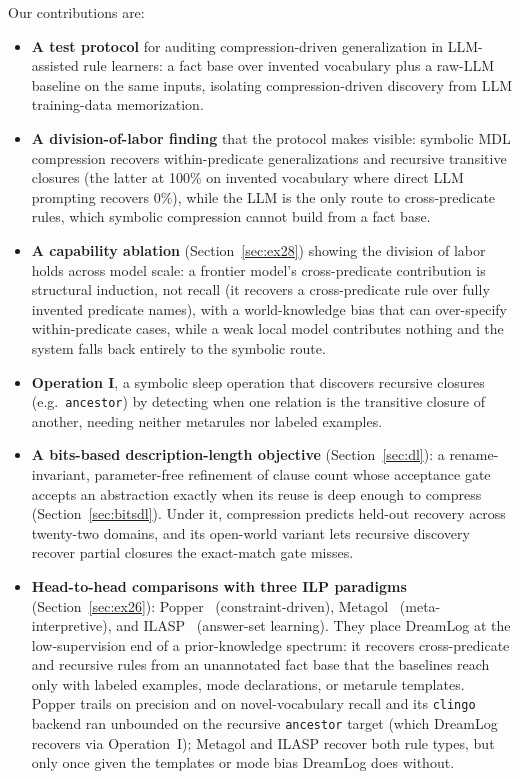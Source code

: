 \documentclass[10pt,conference]{IEEEtran}
\begin{document}
Our contributions are:
\begin{itemize}
\item \textbf{A test protocol} for auditing compression-driven generalization in LLM-assisted rule learners: a fact base over invented vocabulary plus a raw-LLM baseline on the same inputs, isolating compression-driven discovery from LLM training-data memorization.
\item \textbf{A division-of-labor finding} that the protocol makes visible: symbolic MDL compression recovers within-predicate generalizations and recursive transitive closures (the latter at 100\% on invented vocabulary where direct LLM prompting recovers 0\%), while the LLM is the only route to cross-predicate rules, which symbolic compression cannot build from a fact base.
\item \textbf{A capability ablation} (Section~\ref{sec:ex28}) showing the division of labor holds across model scale: a frontier model's cross-predicate contribution is structural induction, not recall (it recovers a cross-predicate rule over fully invented predicate names), with a world-knowledge bias that can over-specify within-predicate cases, while a weak local model contributes nothing and the system falls back entirely to the symbolic route.
\item \textbf{Operation I}, a symbolic sleep operation that discovers recursive closures (e.g.\ \texttt{ancestor}) by detecting when one relation is the transitive closure of another, needing neither metarules nor labeled examples.
\item \textbf{A bits-based description-length objective} (Section~\ref{sec:dl}): a rename-invariant, parameter-free refinement of clause count whose acceptance gate accepts an abstraction exactly when its reuse is deep enough to compress (Section~\ref{sec:bitsdl}). Under it, compression predicts held-out recovery across twenty-two domains, and its open-world variant lets recursive discovery recover partial closures the exact-match gate misses.
\item \textbf{Head-to-head comparisons with three ILP paradigms} (Section~\ref{sec:ex26}): Popper~\cite{cropper2021learning} (constraint-driven), Metagol~\cite{muggleton2014meta} (meta-interpretive), and ILASP~\cite{law2014ilasp} (answer-set learning). They place DreamLog at the low-supervision end of a prior-knowledge spectrum: it recovers cross-predicate and recursive rules from an unannotated fact base that the baselines reach only with labeled examples, mode declarations, or metarule templates. Popper trails on precision and on novel-vocabulary recall and its \texttt{clingo} backend ran unbounded on the recursive \texttt{ancestor} target (which DreamLog recovers via Operation~I); Metagol and ILASP recover both rule types, but only once given the templates or mode bias DreamLog does without.

\end{itemize}
\end{document}
